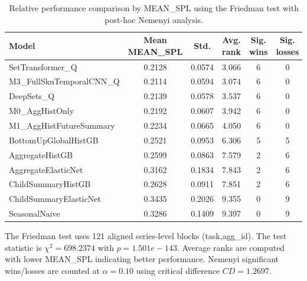 \begin{table}[H]
\centering
\caption{Relative performance comparison by MEAN_SPL using the Friedman test with post-hoc Nemenyi analysis.}
\label{tab:stats_mean_spl}
\begin{threeparttable}
\begin{tabular}{lccccc}
\toprule
Model & Mean MEAN_SPL & Std. & Avg. rank & Sig. wins & Sig. losses \\
\midrule
SetTransformer\_Q & 0.2128 & 0.0574 & 3.066 & 6 & 0 \\
M3\_FullSkuTemporalCNN\_Q & 0.2114 & 0.0594 & 3.074 & 6 & 0 \\
DeepSets\_Q & 0.2139 & 0.0578 & 3.537 & 6 & 0 \\
M0\_AggHistOnly & 0.2192 & 0.0607 & 3.942 & 6 & 0 \\
M1\_AggHistFutureSummary & 0.2234 & 0.0665 & 4.050 & 6 & 0 \\
BottomUpGlobalHistGB & 0.2521 & 0.0953 & 6.306 & 5 & 5 \\
AggregateHistGB & 0.2599 & 0.0863 & 7.579 & 2 & 6 \\
AggregateElasticNet & 0.3162 & 0.1834 & 7.843 & 2 & 6 \\
ChildSummaryHistGB & 0.2628 & 0.0911 & 7.851 & 2 & 6 \\
ChildSummaryElasticNet & 0.3435 & 0.2026 & 9.355 & 0 & 9 \\
SeasonalNaive & 0.3286 & 0.1409 & 9.397 & 0 & 9 \\
\bottomrule
\end{tabular}
\begin{tablenotes}
\footnotesize \item The Friedman test uses 121 aligned series-level blocks (task,agg\_id). The test statistic is $\chi^2=698.2374$ with $p=1.501e-143$. Average ranks are computed with lower MEAN_SPL indicating better performance. Nemenyi significant wins/losses are counted at $\alpha=0.10$ using critical difference $CD=1.2697$.
\end{tablenotes}
\end{threeparttable}
\end{table}

